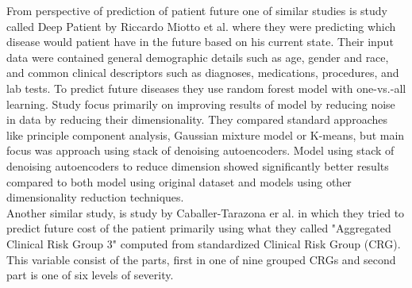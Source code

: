 
From perspective of prediction of patient future one of similar studies is study called Deep Patient by Riccardo Miotto et al. \cite{miotto2016deep} where they were predicting which disease would patient have in the future based on his current state. Their input data were contained general demographic details such as age, gender and race, and common clinical descriptors such as diagnoses, medications, procedures, and lab tests. To predict future diseases they use random forest model with one-vs.-all learning. Study focus primarily on improving results of model by reducing noise in data by reducing their dimensionality. They compared standard approaches like principle component analysis, Gaussian mixture model or K-means, but main focus was approach using stack of denoising autoencoders. Model using stack of denoising autoencoders to reduce dimension showed significantly better results compared to both model using original dataset and models using other dimensionality reduction techniques.
\\

Another similar study, is study by Caballer-Tarazona er al. \cite{caballer2019predicting} in which they tried to predict future cost of the patient primarily using what they called "Aggregated Clinical Risk Group 3" computed from standardized Clinical Risk Group (CRG). This variable consist of the parts, first in one of nine grouped CRGs and second part is one of six levels of severity.